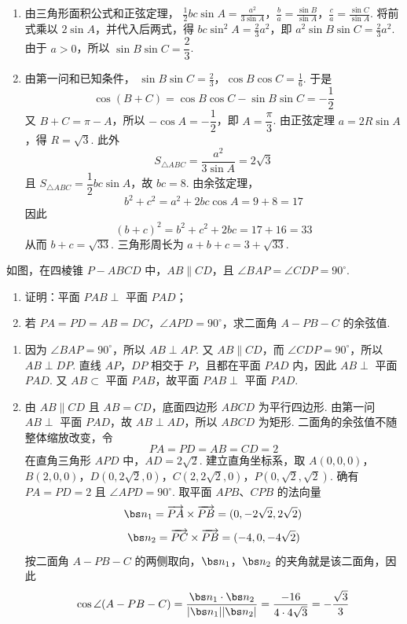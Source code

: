 \begin{solution}
\begin{enumerate}
\item 由三角形面积公式和正弦定理，
\(\frac12bc\sin A=\frac{a^2}{3\sin A}\)，\(\frac ba=\frac{\sin B}{\sin A}\)，\(\frac ca=\frac{\sin C}{\sin A}\).
将前式乘以 \(2\sin A\)，并代入后两式，得
\(bc\sin^2A=\frac23a^2\)，即 \(a^2\sin B\sin C=\frac23a^2\).
由于 \(a>0\)，所以 \(\sin B\sin C=\dfrac23\).

\item 由第一问和已知条件，
\(\sin B\sin C=\frac23\)，\(\cos B\cos C=\frac16\).
于是
\[
\cos(B+C)=\cos B\cos C-\sin B\sin C=-\frac12
\]
又 \(B+C=\pi-A\)，所以 \(-\cos A=-\dfrac12\)，即 \(A=\dfrac\pi3\). 由正弦定理 \(a=2R\sin A\)，得 \(R=\sqrt3\). 此外
\[
S_{\triangle ABC}=\frac{a^2}{3\sin A}=2\sqrt3
\]
且 \(S_{\triangle ABC}=\dfrac12bc\sin A\)，故 \(bc=8\). 由余弦定理，
\[
b^2+c^2=a^2+2bc\cos A=9+8=17
\]
因此
\[
(b+c)^2=b^2+c^2+2bc=17+16=33
\]
从而 \(b+c=\sqrt{33}\). 三角形周长为 \(a+b+c=3+\sqrt{33}\).
\end{enumerate}
\end{solution}

\begin{problem}
如图，在四棱锥 \(P-ABCD\) 中，\(AB\parallel CD\)，且 \(\angle BAP=\angle CDP=90^\circ\).

\begin{enumerate}
\item 证明：平面 \(PAB\perp\) 平面 \(PAD\)；
\item 若 \(PA=PD=AB=DC\)，\(\angle APD=90^\circ\)，求二面角 \(A-PB-C\) 的余弦值.
\end{enumerate}

\end{problem}

\begin{solution}
\begin{enumerate}
\item 因为 \(\angle BAP=90^\circ\)，所以 \(AB\perp AP\). 又 \(AB\parallel CD\)，而 \(\angle CDP=90^\circ\)，所以 \(AB\perp DP\). 直线 \(AP\)，\(DP\) 相交于 \(P\)，且都在平面 \(PAD\) 内，因此 \(AB\perp\) 平面 \(PAD\). 又 \(AB\subset\) 平面 \(PAB\)，故平面 \(PAB\perp\) 平面 \(PAD\).

\item 由 \(AB\parallel CD\) 且 \(AB=CD\)，底面四边形 \(ABCD\) 为平行四边形. 由第一问 \(AB\perp\) 平面 \(PAD\)，故 \(AB\perp AD\)，所以 \(ABCD\) 为矩形. 二面角的余弦值不随整体缩放改变，令
\[
PA=PD=AB=CD=2
\]
在直角三角形 \(APD\) 中，\(AD=2\sqrt2\). 建立直角坐标系，取
\(A(0,0,0)\)，\(B(2,0,0)\)，\(D(0,2\sqrt2,0)\)，\(C(2,2\sqrt2,0)\)，\(P(0,\sqrt2,\sqrt2)\).
确有 \(PA=PD=2\) 且 \(\angle APD=90^\circ\). 取平面 \(APB\)、\(CPB\) 的法向量
\[
\bs n_1=\overrightarrow{PA}\times\overrightarrow{PB}
=(0,-2\sqrt2,2\sqrt2)
\]
\[
\bs n_2=\overrightarrow{PC}\times\overrightarrow{PB}
=(-4,0,-4\sqrt2)
\]
按二面角 \(A-PB-C\) 的两侧取向，\(\bs n_1\)，\(\bs n_2\) 的夹角就是该二面角，因此
\[
\cos\angle(A-PB-C)
=\frac{\bs n_1\cdot\bs n_2}{\lvert\bs n_1\rvert\lvert\bs n_2\rvert}
=\frac{-16}{4\cdot4\sqrt3}
=-\frac{\sqrt3}{3}
\]
\end{enumerate}
\end{solution}

